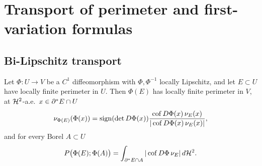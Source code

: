 \chapter{Transport of perimeter and first-variation formulas}\label{ch:transport}

\section{Bi-Lipschitz transport}

\begin{theorem}\label{thm:transport-perimeter}
Let $\Phi:U\to V$ be a $C^1$ diffeomorphism with
$\Phi,\Phi^{-1}$ locally Lipschitz, and let $E\subset U$ have locally finite
perimeter in $U$.  Then $\Phi(E)$ has locally finite perimeter in $V$, at
$\mathcal H^2$-a.e.\ $x\in\partial^* E\cap U$
\begin{equation}\label{eq:transport-normal}
  \nu_{\Phi(E)}(\Phi(x))
  =\operatorname{sign}(\det D\Phi(x))
   \frac{\operatorname{cof} D\Phi(x)\,\nu_E(x)}{|\operatorname{cof} D\Phi(x)\,\nu_E(x)|},
\end{equation}
and for every Borel $A\subset U$
\begin{equation}\label{eq:transport-perimeter}
  P\bigl(\Phi(E);\Phi(A)\bigr)
  =\int_{\partial^* E\cap A}|\operatorname{cof} D\Phi\,\nu_E|\,d\mathcal H^2 .
\end{equation}
\end{theorem}

